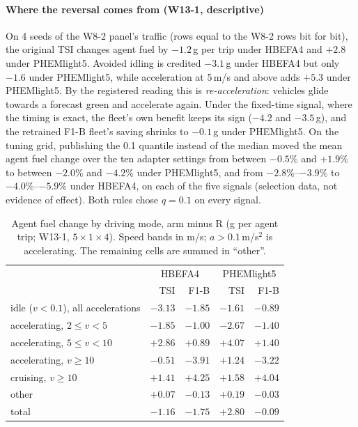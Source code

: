 \paragraph{Where the reversal comes from (W13-1, descriptive)} On 4 seeds of the W8-2 panel's traffic (rows equal to the W8-2 rows bit for
bit), the original TSI changes agent fuel by $-1.2$\,g per trip under HBEFA4 and $+2.8$ under PHEMlight5. Avoided idling is credited
$-3.1$\,g under HBEFA4 but only $-1.6$ under PHEMlight5, while acceleration at 5\,m/s and above adds $+5.3$ under PHEMlight5. By the
registered reading this is \emph{re-acceleration}: vehicles glide towards a forecast green and accelerate again. Under the fixed-time signal,
where the timing is exact, the fleet's own benefit keeps its sign ($-4.2$ and $-3.5$\,g), and the retrained F1-B fleet's saving shrinks to
$-0.1$\,g under PHEMlight5. On the tuning grid, publishing the 0.1 quantile instead of the median moved the mean agent fuel change over the ten
adapter settings from between $-0.5\%$ and $+1.9\%$ to between $-2.0\%$ and $-4.2\%$ under PHEMlight5, and from $-2.8\%$--$-3.9\%$ to
$-4.0\%$--$-5.9\%$ under HBEFA4, on each of the five signals (selection data, not evidence of effect). Both rules chose $q=0.1$ on every
signal.
\begin{table}[t]\centering\footnotesize\setlength{\tabcolsep}{3pt}
\caption{Agent fuel change by driving mode, arm minus R (g per agent trip; W13-1, $5\times1\times4$). Speed bands in m/s;
$a>0.1$\,m/s$^2$ is accelerating. The remaining cells are summed in ``other''.}\label{tab:w13modes}
\begin{tabular}{@{}lrrrr@{}}\toprule
 & \multicolumn{2}{c}{HBEFA4} & \multicolumn{2}{c}{PHEMlight5}\\
 & TSI & F1-B & TSI & F1-B\\\midrule
idle ($v<0.1$), all accelerations & $-3.13$ & $-1.85$ & $-1.61$ & $-0.89$\\
accelerating, $2\le v<5$ & $-1.85$ & $-1.00$ & $-2.67$ & $-1.40$\\
accelerating, $5\le v<10$ & $+2.86$ & $+0.89$ & $+4.07$ & $+1.40$\\
accelerating, $v\ge10$ & $-0.51$ & $-3.91$ & $+1.24$ & $-3.22$\\
cruising, $v\ge10$ & $+1.41$ & $+4.25$ & $+1.58$ & $+4.04$\\
other & $+0.07$ & $-0.13$ & $+0.19$ & $-0.03$\\\midrule
total & $-1.16$ & $-1.75$ & $+2.80$ & $-0.09$\\\bottomrule
\end{tabular}\end{table}
